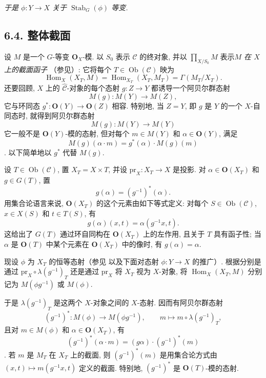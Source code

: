 \begin{figure}[H]
  \centering
  
  \label{fig:sga3-exp1-p041-stabilizer-square}
\end{figure}

\textit{于是 \(\phi:Y\to X\) 关于 \(\operatorname{Stab}_G(\phi)\) 等变.}

\subsection*{6.4. 整体截面}

设 \(M\) 是一个 \(G\)-等变 \(\mathbf O_X\)-模.
以 \(S_0\) 表示 \(\mathscr C\) 的终对象, 并以
\(\prod_{X/S_0}M\) 表示\emph{\(M\) 在 \(X\) 上的截面函子}
（参见）:
它将每个 \(T\in\operatorname{Ob}(\mathscr C)\) 映为
\[
  \operatorname{Hom}_X(X_T,M)
  =\operatorname{Hom}_{X_T}(X_T,M_T)
  =\Gamma(M_T/X_T).
\]
还要回顾, \(X\) 上的 \(\widehat{\mathscr C}\)-对象的每个态射
\(g:Z\to Y\) 都诱导一个阿贝尔群态射
\[
  M(g):M(Y)\longrightarrow M(Z),
\]
它与环同态 \(g^*:\mathbf O(Y)\to\mathbf
O(Z)\) 相容. 特别地, 当 \(Z=Y\), 即 \(g\) 是 \(Y\) 的一个
\(X\)-自同态时, 就得到阿贝尔群态射
\[
  M(g):M(Y)\longrightarrow M(Y)
\]
它一般不是 \(\mathbf O(Y)\)-模的态射, 但对每个
\(m\in M(Y)\) 和 \(\alpha\in\mathbf O(Y)\), 满足
\[
  M(g)(\alpha\cdot m)=g^*(\alpha)\cdot M(g)(m)
\]
. 以下简单地以 \(g^*\) 代替 \(M(g)\).

设 \(T\in\operatorname{Ob}(\mathscr C)\), 置 \(X_T=X\times T\),
并设 \(\mathrm{pr}_X:X_T\to X\) 是投影.
对 \(\alpha\in\mathbf O(X_T)\) 和 \(g\in G(T)\), 置
\[
  g(\alpha)=(g^{-1})^*(\alpha).
\]
用集合论语言来说, \(\mathbf O(X_T)\) 的这个元素由如下等式定义:
对每个 \(S\in\operatorname{Ob}(\mathscr C)\), \(x\in X(S)\) 和
\(t\in T(S)\), 有
\[
  g(\alpha)(x,t)=\alpha(g^{-1}x,t).
\]
这给出了 \(G(T)\) 通过环自同构在 \(\mathbf O(X_T)\) 上的左作用,
且关于 \(T\) 具有函子性; 当 \(\alpha\) 是 \(\mathbf O(T)\)
中某个元素在 \(\mathbf O(X_T)\) 中的像时, 有 \(g(\alpha)=\alpha\).

现设 \(\phi\) 为 \(X_T\) 的恒等态射（参见 
以及下面对态射 \(\phi:Y\to X\) 的推广）.
根据分别是通过 \(\mathrm{pr}_X\circ\lambda(g^{-1})_T\) 还是通过
\(\mathrm{pr}_X\) 将 \(X_T\) 视为 \(X\)-对象, 将
\(\operatorname{Hom}_X(X_T,M)\) 分别记为 \(M(\phi g^{-1})\) 或 \(M(\phi)\).

于是 \(\lambda(g^{-1})_T\) 是这两个 \(X\)-对象之间的 \(X\)-态射.
因而有阿贝尔群态射
\[
  (g^{-1})^*:M(\phi)\longrightarrow M(\phi g^{-1}),
  \qquad
  m\longmapsto m\circ\lambda(g^{-1})_T,
\]
且对 \(m\in M(\phi)\) 和 \(\alpha\in\mathbf O(X_T)\), 有
\[
  (g^{-1})^*(\alpha\cdot m)
  =(g\alpha)\cdot(g^{-1})^*(m)
\]
. 若 \(m\) 是 \(M_T\) 在 \(X_T\) 上的截面, 则
\((g^{-1})^*(m)\) 是用集合论方式由
\((x,t)\mapsto m(g^{-1}x,t)\) 定义的截面.
特别地, \((g^{-1})^*\) 是 \(\mathbf O(T)\)-模的态射.

